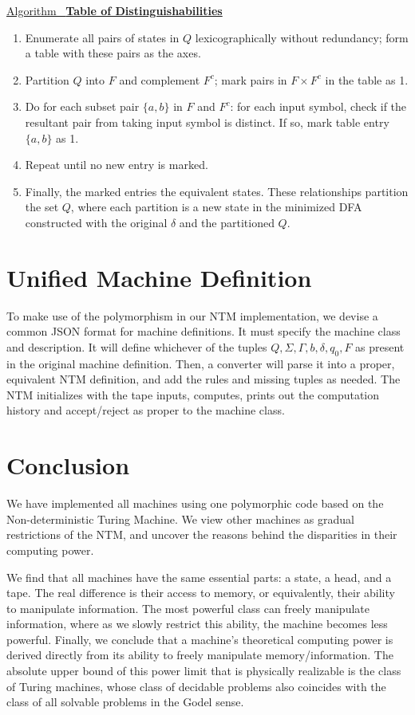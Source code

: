 \documentclass[12pt]{article}  %
\newcommand{\algtitle}[1]{\underline{Algorithm \ {\bf #1}} \vspace*{1mm}\\}
\begin{document}
\algtitle{Table of Distinguishabilities}
\begin{enumerate}
	\item Enumerate all pairs of states in $Q$ lexicographically without redundancy; form a table with these pairs as the axes.
	\item Partition $Q$ into $F$ and complement $F^c$; mark pairs in $F \times F^c$ in the table as 1.
	\item Do for each subset pair $\{a,b\}$ in $F$ and $F^c$:
	for each input symbol, check if the resultant pair from taking input symbol is distinct. If so, mark table entry $\{a,b\}$ as 1.
	\item Repeat until no new entry is marked.
	\item Finally, the marked entries the equivalent states. These relationships partition the set $Q$, where each partition is a new state in the minimized DFA constructed with the original $\delta$ and the partitioned $Q$.
\end{enumerate}





\section{Unified Machine Definition}
To make use of the polymorphism in our NTM implementation, we devise a common JSON format for machine definitions. It must specify the machine class and description. It will define whichever of the tuples $Q, \Sigma, \Gamma, b, \delta, q_0, F$ as present in the original machine definition. Then, a converter will parse it into a proper, equivalent NTM definition, and add the rules and missing tuples as needed. The NTM initializes with the tape inputs, computes, prints out the computation history and accept/reject as proper to the machine class.



\section{Conclusion}
We have implemented all machines using one polymorphic code based on the Non-deterministic Turing Machine. We view other machines as gradual restrictions of the NTM, and uncover the reasons behind the disparities in their computing power. 

We find that all machines have the same essential parts: a state, a head, and a tape. The real difference is their access to memory, or equivalently, their ability to manipulate information. The most powerful class can freely manipulate information, where as we slowly restrict this ability, the machine becomes less powerful. Finally, we conclude that a machine's theoretical computing power is derived directly from its ability to freely manipulate memory/information. The absolute upper bound of this power limit that is physically realizable is the class of Turing machines, whose class of decidable problems also coincides with the class of all solvable problems in the Godel sense.
\end{document}
